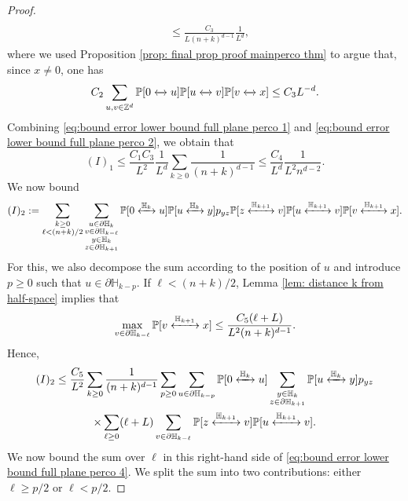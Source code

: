 \documentclass[11pt,a4paper]{article}
\numberwithin{equation}{section}
\theoremstyle{plain}
\theoremstyle{definition}
\newcommand{\connect}{\xleftrightarrow}
\begin{document}
\begin{proof}
\begin{align}
	\\&\leq \frac{C_3}{L(n+k)^{d-1}}\frac{1}{L^d},\label{eq:bound error lower bound full plane perco 2}
\end{align}
where we used Proposition \ref{prop: final prop proof mainperco thm} to argue that, since $x\neq 0$, one has
\begin{equation}
	C_2\sum_{u,v\in \mathbb Z^d}\mathbb P[0\connect{}u]\mathbb P[u\connect{}v]\mathbb P[v\connect{}x]\leq  C_3 L^{-d}.
\end{equation}
Combining \eqref{eq:bound error lower bound full plane perco 1} and \eqref{eq:bound error lower bound full plane perco 2}, we obtain that 
\begin{equation}
	(I)_1\leq \frac{C_1C_3}{L^2}\frac{1}{L^d}\sum_{k\geq 0} \frac{1}{(n+k)^{d-1}}\leq \frac{C_4}{L^d}\frac{1}{L^2n^{d-2}}.\label{eq: I 1}
\end{equation}
We now bound
\begin{equation}
	(I)_2:=\sum_{\substack{k\ge0\\ \ell<(n+k)/2}}\sum_{\substack{u\in \partial\mathbb H_{k}\\v\in \partial \mathbb H_{k-\ell}\\y\in \mathbb H_k\\z\in \partial\mathbb H_{k+1}}}\mathbb P[0\connect{\mathbb H_k\:}u]\mathbb P[u\connect{\mathbb H_k\:}y]p_{yz}\mathbb P[z\connect{\mathbb H_{k+1}\:}v]\mathbb P[u\connect{\mathbb H_{k+1}\:}v]\mathbb P[v\connect{\mathbb H_{k+1}\:}x].
\end{equation}
For this, we also decompose the sum according to the position of $u$ and introduce $p\geq 0$ such that $u\in \partial \mathbb H_{k-p}$.
If $\ell<(n+k)/2$, Lemma \ref{lem: distance k from half-space} implies that
\begin{equation}\label{eq:bound error lower bound full plane perco 3}
	\max_{v\in \partial \mathbb H_{k-\ell}}\mathbb P[v\connect{\mathbb H_{k+1}\:}x]\leq \frac{C_5(\ell+L)}{L^2(n+k)^{d-1}}.
\end{equation}
 Hence,
 \begin{multline}\label{eq:bound error lower bound full plane perco 4}
 	(I)_2\leq \frac{C_5}{L^2}\sum_{k\geq 0}\frac{1}{(n+k)^{d-1}}\sum_{p \geq 0}\sum_{u\in \partial \mathbb H_{k-p}}\mathbb P[0\connect{\mathbb H_k\:}u]\sum_{\substack{y\in \mathbb H_k\\z \in \partial \mathbb H_{k+1}}}\mathbb P[u\connect{\mathbb H_k\:}y]p_{yz}\\\times\sum_{\ell\geq 0}(\ell+L)\sum_{v\in \partial \mathbb H_{k-\ell}}\mathbb P[z\connect{\mathbb H_{k+1}\:}v]\mathbb P[u\connect{\mathbb H_{k+1}\:}v].
 \end{multline}
 We now bound the sum over $\ell$ in this right-hand side of \eqref{eq:bound error lower bound full plane perco 4}. We split the sum into two contributions: either $\ell \geq p/2$ or $\ell <p/2$. 
 

\end{proof}
\end{document}

